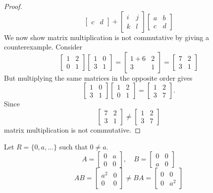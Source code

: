 \begin{proof}
\[\begin{bmatrix}
        c & d
    \end{bmatrix}
    +
    \begin{bmatrix}
        i & j \\
        k & l
    \end{bmatrix}
    \begin{bmatrix}
        a & b \\
        c & d
    \end{bmatrix}
    \]
    We now show matrix multiplication is not commutative 
        by giving a counterexample.
    Consider
    \[
    \begin{bmatrix}
    1 & 2 \\
    0 & 1
    \end{bmatrix}
    \begin{bmatrix}
    1 & 0 \\
    3 & 1
    \end{bmatrix}
    =
    \begin{bmatrix}
    1+6 & 2 \\
    3 & 1
    \end{bmatrix}
    =
    \begin{bmatrix}
    7 & 2 \\
    3 & 1
    \end{bmatrix}
    \]
    But multiplying the same matrices in the opposite order gives
    \[
    \begin{bmatrix}
    1 & 0 \\
    3 & 1
    \end{bmatrix}
    \begin{bmatrix}
    1 & 2 \\
    0 & 1
    \end{bmatrix}
    =
    \begin{bmatrix}
    1 & 2 \\
    3 & 7
    \end{bmatrix}.
    \]
    Since
    \[
    \begin{bmatrix}
    7 & 2 \\
    3 & 1
    \end{bmatrix}
    \neq
    \begin{bmatrix}
    1 & 2 \\
    3 & 7
    \end{bmatrix}
    \]
    matrix multiplication is not commutative.
\end{proof}

Let $R = \{0, a, \ldots\}$ such that $0 \ne a$.
\[
A = \begin{bmatrix} 0 & a \\ 0 & 0 \end{bmatrix}, \quad
B = \begin{bmatrix} 0 & 0 \\ a & 0 \end{bmatrix}
\]
\[
AB = \begin{bmatrix} a^2 & 0 \\ 0 & 0 \end{bmatrix} \neq 
BA = \begin{bmatrix} 0 & 0 \\ 0 & a^2 \end{bmatrix}
\]

